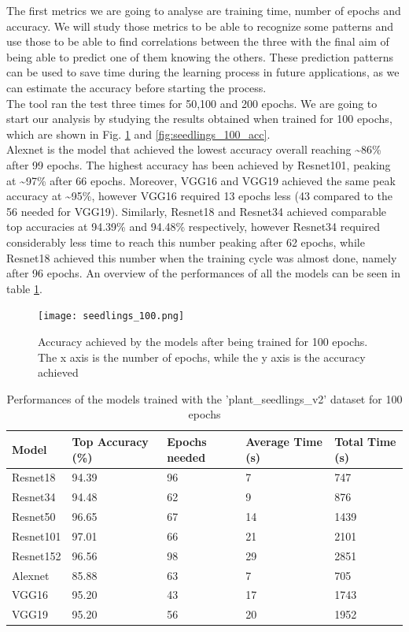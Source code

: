 The first metrics we are going to analyse are training time, number of epochs and accuracy. We will study those metrics to be able to recognize some patterns and use those to be able to find correlations between the three with the final aim of being able to predict one of them knowing the others. These prediction patterns can be used to save time during the learning process in future applications, as we can estimate the accuracy before starting the process.  \\
The tool ran the test three times for 50,100 and 200 epochs. 
We are going to start our analysis by studying the results obtained when trained for 100 epochs, which are shown in Fig. \ref{fig:seedlings_100_epoch_accuracy} and \ref{fig:seedlings_100_acc}. \\
Alexnet is the model that achieved the lowest accuracy overall reaching \textasciitilde86\% after 99 epochs. The highest accuracy has been achieved by Resnet101, peaking at \textasciitilde97\% after 66 epochs. Moreover, VGG16 and VGG19 achieved the same peak accuracy at \textasciitilde95\%, however VGG16 required 13 epochs less (43 compared to the 56 needed for VGG19). Similarly, Resnet18 and Resnet34 achieved comparable top accuracies at  94.39\% and 94.48\% respectively, however Resnet34 required considerably less time to reach this number peaking after 62 epochs, while Resnet18 achieved this number when the training cycle was almost done, namely after 96 epochs. An overview of the performances of all the models can be seen in table \ref{tab:performances_seeds}. 

\begin{figure}[h]
       \centering 
	    \texttt{[image: seedlings\_100.png]}
        \caption[Accuracy achieved by the models after being trained for 100 epochs]{Accuracy achieved by the models after being trained for 100 epochs. The x axis is the number of epochs, while the y axis is the accuracy achieved}
         \label{fig:seedlings_100_epoch_accuracy}
\end{figure}


\begin{table}[htbp]
\centering
\begin{tabular}{ p{2cm} p{4cm} p{3cm} p{3cm} p{2cm}  }
 Model& Top Accuracy (\%) & Epochs needed &Average Time (s)&Total Time (s)\\
 \hline
Resnet18&94.39&96&7&747\\
Resnet34&94.48&62&9&876\\
Resnet50&96.65&67&14&1439\\
Resnet101&97.01&66&21&2101\\
Resnet152&96.56&98&29&2851\\
Alexnet&85.88&63&7&705\\
VGG16&95.20&43&17&1743\\
VGG19&95.20&56&20&1952\\
 \hline
\end{tabular}
\caption{Performances of the models trained with the 'plant\_seedlings\_v2' dataset for 100 epochs}
\label{tab:performances_seeds}
\end{table}


